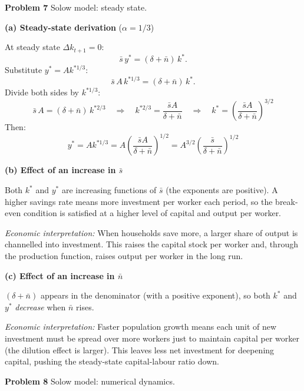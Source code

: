 \documentclass[12pt]{article}
\newenvironment{soln}{%
  \begin{tcolorbox}[
    breakable,
    colback=blue!4!white,
    colframe=blue!50!black,
    title={\textbf{Solution}},
    fonttitle=\small,
    left=4pt, right=4pt, top=4pt, bottom=4pt
  ]
}{%
  \end{tcolorbox}
}
\begin{document}
\bigskip


\noindent\textbf{Problem 7} \quad Solow model: steady state.

\begin{soln}
\textbf{(a) Steady-state derivation} ($\alpha = 1/3$)

At steady state $\Delta k_{t+1} = 0$:
\[
  \bar{s}\,y^* = (\delta+\bar{n})\,k^*.
\]
Substitute $y^* = A k^{*1/3}$:
\[
  \bar{s}\,A\,k^{*1/3} = (\delta+\bar{n})\,k^*.
\]
Divide both sides by $k^{*1/3}$:
\[
  \bar{s}\,A = (\delta+\bar{n})\,k^{*2/3}
  \quad\Rightarrow\quad
  k^{*2/3} = \frac{\bar{s}A}{\delta+\bar{n}}
  \quad\Rightarrow\quad
  \boxed{k^* = \left(\frac{\bar{s}A}{\delta+\bar{n}}\right)^{3/2}}
\]
Then:
\[
  y^* = A k^{*1/3}
  = A \left(\frac{\bar{s}A}{\delta+\bar{n}}\right)^{1/2}
  = \boxed{A^{3/2}\left(\frac{\bar{s}}{\delta+\bar{n}}\right)^{1/2}}
\]

\textbf{(b) Effect of an increase in $\bar{s}$}

Both $k^*$ and $y^*$ are increasing functions of $\bar{s}$ (the exponents
are positive).  A higher savings rate means more investment per worker each
period, so the break-even condition is satisfied at a higher level of capital
and output per worker.

\textit{Economic interpretation:} When households save more, a larger share
of output is channelled into investment.  This raises the capital stock per
worker and, through the production function, raises output per worker in the
long run.

\textbf{(c) Effect of an increase in $\bar{n}$}

$(\delta+\bar{n})$ appears in the denominator (with a positive exponent),
so both $k^*$ and $y^*$ \emph{decrease} when $\bar{n}$ rises.

\textit{Economic interpretation:} Faster population growth means each unit of
new investment must be spread over more workers just to maintain capital per
worker (the dilution effect is larger).  This leaves less net investment for
deepening capital, pushing the steady-state capital-labour ratio down.
\end{soln}

\bigskip

\noindent\textbf{Problem 8} \quad Solow model: numerical dynamics.
\end{document}

